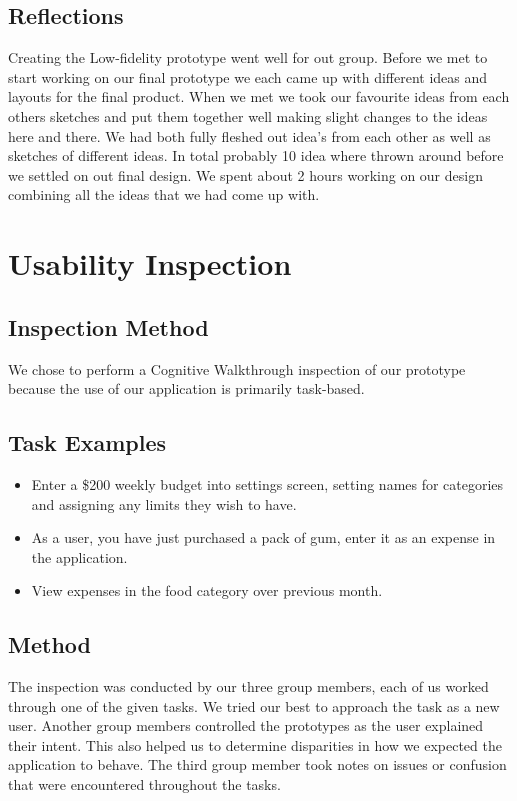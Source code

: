 \documentclass{chi2011}
\begin{document}
    \subsection{Reflections}
	Creating the Low-fidelity prototype went well for out group. Before we met
	to start working on our final prototype we each came up with different ideas
	and layouts for the final product. When we met we took our favourite ideas
	from each others sketches and put them together well making slight changes
	to the ideas here and there. We had both fully fleshed out idea's from each
	other as well as sketches of different ideas. In total probably 10 idea
	where thrown around before we settled on out final design. We spent about 2
	hours working on our design combining all the ideas that we had come up
	with.

\section{Usability Inspection}
    \subsection{Inspection Method}
    We chose to perform a Cognitive Walkthrough inspection of our prototype because the use of our application
    is primarily task-based. 

    \subsection{Task Examples}
    \begin{itemize}
        \item Enter a \$200 weekly budget into settings screen, setting names for categories and assigning any limits
            they wish to have.
        \item As a user, you have just purchased a pack of gum, enter it as an expense in the application.
        \item View expenses in the food category over previous month.
    \end{itemize}

    \subsection{Method}
    The inspection was conducted by our three group members, each of us worked through one of the given tasks. We
    tried our best to approach the task as a new user. Another group members controlled the prototypes as the user
    explained their intent. This also helped us to determine disparities in how we expected the application to behave.
    The third group member took notes on issues or confusion that were encountered throughout the tasks.
\end{document}

